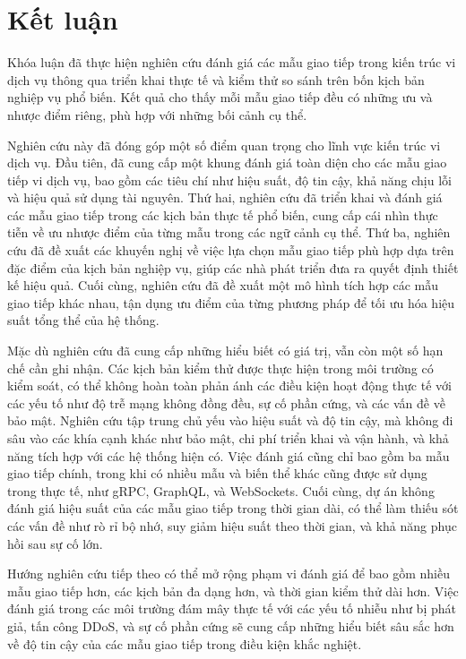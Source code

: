 \chapter{Kết luận}

Khóa luận đã thực hiện nghiên cứu đánh giá các mẫu giao tiếp trong kiến trúc vi dịch vụ thông qua triển khai thực tế và kiểm thử so sánh trên bốn kịch bản nghiệp vụ phổ biến. Kết quả cho thấy mỗi mẫu giao tiếp đều có những ưu và nhược điểm riêng, phù hợp với những bối cảnh cụ thể.

Nghiên cứu này đã đóng góp một số điểm quan trọng cho lĩnh vực kiến trúc vi dịch vụ. Đầu tiên, đã cung cấp một khung đánh giá toàn diện cho các mẫu giao tiếp vi dịch vụ, bao gồm các tiêu chí như hiệu suất, độ tin cậy, khả năng chịu lỗi và hiệu quả sử dụng tài nguyên. Thứ hai, nghiên cứu đã triển khai và đánh giá các mẫu giao tiếp trong các kịch bản thực tế phổ biến, cung cấp cái nhìn thực tiễn về ưu nhược điểm của từng mẫu trong các ngữ cảnh cụ thể. Thứ ba, nghiên cứu đã đề xuất các khuyến nghị về việc lựa chọn mẫu giao tiếp phù hợp dựa trên đặc điểm của kịch bản nghiệp vụ, giúp các nhà phát triển đưa ra quyết định thiết kế hiệu quả. Cuối cùng, nghiên cứu đã đề xuất một mô hình tích hợp các mẫu giao tiếp khác nhau, tận dụng ưu điểm của từng phương pháp để tối ưu hóa hiệu suất tổng thể của hệ thống.

Mặc dù nghiên cứu đã cung cấp những hiểu biết có giá trị, vẫn còn một số hạn chế cần ghi nhận. Các kịch bản kiểm thử được thực hiện trong môi trường có kiểm soát, có thể không hoàn toàn phản ánh các điều kiện hoạt động thực tế với các yếu tố như độ trễ mạng không đồng đều, sự cố phần cứng, và các vấn đề về bảo mật. Nghiên cứu tập trung chủ yếu vào hiệu suất và độ tin cậy, mà không đi sâu vào các khía cạnh khác như bảo mật, chi phí triển khai và vận hành, và khả năng tích hợp với các hệ thống hiện có. Việc đánh giá cũng chỉ bao gồm ba mẫu giao tiếp chính, trong khi có nhiều mẫu và biến thể khác cũng được sử dụng trong thực tế, như gRPC, GraphQL, và WebSockets. Cuối cùng, dự án không đánh giá hiệu suất của các mẫu giao tiếp trong thời gian dài, có thể làm thiếu sót các vấn đề như rò rỉ bộ nhớ, suy giảm hiệu suất theo thời gian, và khả năng phục hồi sau sự cố lớn.

Hướng nghiên cứu tiếp theo có thể mở rộng phạm vi đánh giá để bao gồm nhiều mẫu giao tiếp hơn, các kịch bản đa dạng hơn, và thời gian kiểm thử dài hơn. Việc đánh giá trong các môi trường đám mây thực tế với các yếu tố nhiễu như bị phát giả, tấn công DDoS, và sự cố phần cứng sẽ cung cấp những hiểu biết sâu sắc hơn về độ tin cậy của các mẫu giao tiếp trong điều kiện khắc nghiệt.

